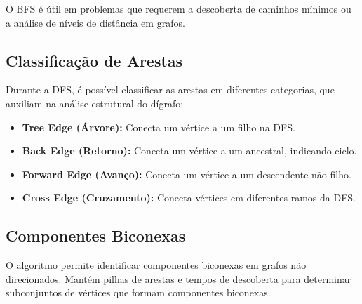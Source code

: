 O BFS é útil em problemas que requerem a descoberta de caminhos mínimos ou a análise de níveis de distância em grafos.

\subsection{Classificação de Arestas}

Durante a DFS, é possível classificar as arestas em diferentes categorias, que auxiliam na análise estrutural do dígrafo:

\begin{itemize}
    \item \textbf{Tree Edge (Árvore):} Conecta um vértice a um filho na DFS.
    \item \textbf{Back Edge (Retorno):} Conecta um vértice a um ancestral, indicando ciclo.
    \item \textbf{Forward Edge (Avanço):} Conecta um vértice a um descendente não filho.
    \item \textbf{Cross Edge (Cruzamento):} Conecta vértices em diferentes ramos da DFS.
\end{itemize}

\subsection{Componentes Biconexas}

O algoritmo permite identificar componentes biconexas em grafos não direcionados. Mantém pilhas de arestas e tempos de descoberta para determinar subconjuntos de vértices que formam componentes biconexas.

